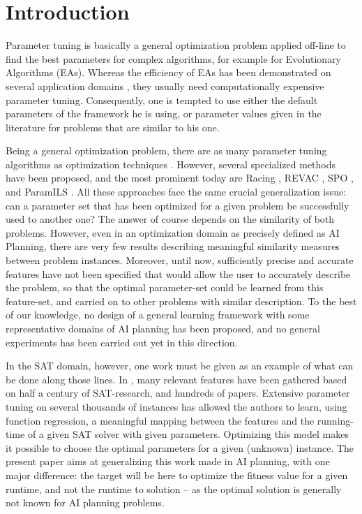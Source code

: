 \documentclass[runningheads,a4paper]{llncs}
\begin{document}
\section{Introduction}

Parameter tuning is basically a general optimization problem applied off-line to find the best parameters for complex algorithms, for example for Evolutionary Algorithms (EAs). Whereas the efficiency of EAs has been demonstrated on several application domains \cite{practice08,ParameterSettingBook07}, they usually need computationally expensive parameter tuning. Consequently, one is tempted to use either the default parameters of the framework he is using, or parameter values given in the literature for problems that are similar to his one. 

Being a general optimization problem, there are as many parameter tuning algorithms as optimization techniques \cite{Eiben2007,Montero:2010}. However, several specialized methods have been proposed, and the most prominent today are Racing \cite{birattari2002}, REVAC \cite{Nannen07}, SPO \cite{SPO:CEC05}, and ParamILS \cite{ParamILS-JAIR}. All these approaches face the same crucial generalization issue: can a parameter set that has been optimized for a given problem be successfully used to another one? The answer of course depends on the similarity of both problems. However, even in an optimization domain as precisely defined as AI Planning, there are very few results describing meaningful similarity measures between problem instances. Moreover, until now, sufficiently precise and accurate features have not been specified that would allow the user to accurately describe the problem, so that the optimal parameter-set could be learned from this feature-set, and carried on to other problems with similar description. To the best of our knowledge, no design of a general learning framework with some representative domains of AI planning has been proposed, and no general experiments has been carried out yet in this direction.

In the SAT domain, however, one work must be given as an example of what can be done along those lines. In \cite{Hutter06}, many relevant features have been gathered based on half a century of SAT-research, and hundreds of papers. Extensive parameter tuning on several thousands of instances has allowed the authors to learn, using function regression, a meaningful mapping between the features and the running-time of a given SAT solver with given parameters. Optimizing this model makes it possible to choose the optimal parameters for a given (unknown) instance. The present paper aims at generalizing this work made in AI planning, with one major difference: the target will be here to optimize the fitness value for a given runtime, and not the runtime to solution -- as the optimal solution is generally not known for AI planning problems. 
\end{document}
